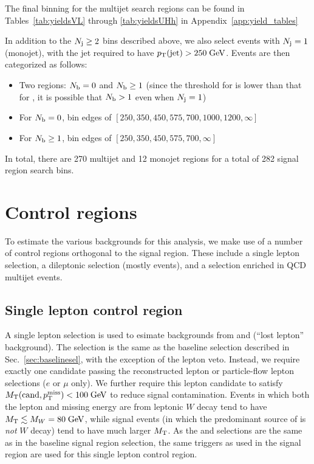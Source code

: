 The final \mttwo binning for the multijet search regions can be found in 
Tables~\ref{tab:yieldsVL} through \ref{tab:yieldsUHh} in Appendix~\ref{app:yield_tables}

In addition to the $N_{\mathrm{j}}\geq2$ bins described above, we also select events with $N_{\mathrm{j}}=1$ (monojet), with the jet required to have
$p_{\mathrm{T}}(\mathrm{jet})>250\;\text{Ge\hspace{-.08em}V}$. Events are then categorized as follows:
\begin{itemize}\setlength\itemsep{-1mm}
\item Two \Nb regions: $N_{\mathrm{b}}=0$ and $N_{\mathrm{b}}\geq1$ (since the \pt threshold for \Nb is lower than that for \Nj, it
is possible that $N_{\mathrm{b}}>1$ even when $N_{\mathrm{j}}=1$)
\item For $N_{\mathrm{b}}=0$, \Ht bin edges of $[250,350,450,575,700,1000,1200,\infty]$\GeV
\item For $N_{\mathrm{b}}\geq1$, \Ht bin edges of $[250,350,450,575,700,\infty]$\GeV
\end{itemize}

In total, there are 270 multijet and 12 monojet regions for a total of 282 signal region search bins.

\section{Control regions}
\label{sec:crdefs}

To estimate the various backgrounds for this analysis, we make use of a number of control regions orthogonal 
to the signal region. These include a single lepton selection, a dileptonic selection (mostly \zll events), 
and a selection enriched in QCD multijet events.

\subsection{Single lepton control region}
\label{sec:crsl}
A single lepton selection is used to esimate backgrounds from \ttbar and \wjets (``lost lepton'' background).
The selection is the same as the baseline selection described in Sec.~\ref{sec:baselinesel}, with
the exception of the lepton veto. Instead, we require exactly one candidate passing the reconstructed lepton
or particle-flow lepton selections ($e$ or $\mu$ only). We further require this lepton candidate to satisfy
$M_{\mathrm{T}}(\mathrm{cand},p_{\mathrm{T}}^{\mathrm{miss}})<100\;\text{Ge\hspace{-.08em}V}$ to reduce signal contamination. Events in which both the lepton
and missing energy are from leptonic $W$ decay tend to have $M_{\mathrm{T}}\lesssim M_W=80\;\text{Ge\hspace{-.08em}V}$, while signal
events (in which the predominant source of \ptmiss is \emph{not} $W$ decay) tend to have much larger $M_{\mathrm{T}}$.
As the \Ht and \ptmiss selections are the same as in the baseline signal region selection, 
the same triggers as used in the signal region are used for this single lepton control region.

